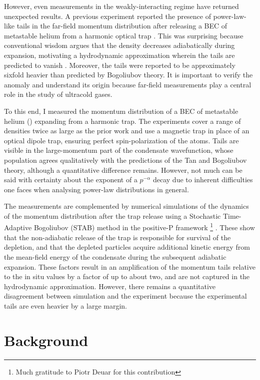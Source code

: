 	However, even measurements in the weakly-interacting regime have returned unexpected results.
	A previous experiment reported the presence of power-law-like tails in the far-field momentum distribution after releasing a BEC of metastable helium from a harmonic optical trap \cite{Chang16}.
	This was surprising because conventional wisdom argues that the density decreases adiabatically during expansion, motivating a hydrodynamic approximation wherein the tails are predicted to vanish \cite{Qu16,Xu06}. 
	Moreover, the tails were reported to be approximately sixfold heavier than predicted by Bogoliubov theory.
	It is important to verify the anomaly and understand its origin because far-field measurements play a central role in the study of ultracold gases.
	
	To this end, I measured the momentum distribution of a BEC of metastable helium (\mhe) expanding from a harmonic trap. 
	The experiments cover a range of densities twice as large as the prior work and use a magnetic trap in place of an optical dipole trap, ensuring perfect spin-polarization of the atoms. 
	Tails are visible in the large-momentum part of the condensate wavefunction, whose population agrees qualitatively with the predictions of the Tan and Bogoliubov theory, although a quantitative difference remains.
	However, not much can be said with certainty about the exponent of a $p^{-\alpha}$ decay due to inherent difficulties one faces when analysing power-law distributions in general. 
	
	The measurements are complemented by numerical simulations of the dynamics of the momentum distribution after the trap release using a Stochastic Time-Adaptive Bogoliubov (STAB) method in the positive-P framework \footnote{Much gratitude to Piotr Deuar for this contribution} \cite{Deuar11,Kheruntsyan12}. 
	These show that the non-adiabatic release of the trap is responsible for survival of the depletion, and that the depleted particles acquire additional kinetic energy from the mean-field energy of the condensate during the subsequent adiabatic expansion. 
	These factors result in an amplification of the momentum tails relative to the in situ values {by a factor of up to about two}, and are not captured in the hydrodynamic approximation. 
	However, there remains a quantitative disagreement between simulation and the experiment {because the experimental tails are even heavier by a large margin.}

	
\section{Background} 

